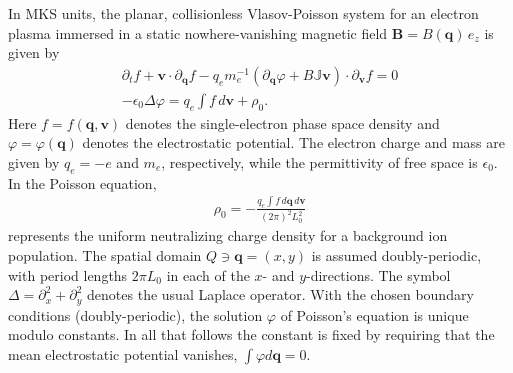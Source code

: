 \documentclass[%
 aip,
 amsmath,amssymb,
reprint, onecolumn %
]{revtex4-1}
\begin{document}
In MKS units, the planar, collisionless Vlasov-Poisson system for an electron plasma immersed in a static nowhere-vanishing magnetic field $\bm{B} = B(\bm{q})\,e_z$ is given by
\begin{gather*}
\partial_tf + \bm{v}\cdot\partial_{\bm{q}} f  -q_em_e^{-1}( \partial_{\bm{q}}\varphi + B\mathbb{J}\bm{v})\cdot\partial_{\bm{v}}f = 0\\
-\epsilon_0\Delta \varphi = q_e\int f\,d\bm{v} + \rho_0.
\end{gather*}
Here $f = f(\bm{q},\bm{v})$ denotes the single-electron phase space density and $\varphi = \varphi(\bm{q})$ denotes the electrostatic potential. The electron charge and mass are given by $q_e = -e$ and $m_e$, respectively, while the permittivity of free space is $\epsilon_0$. In the Poisson equation, 
\begin{align*}
\rho_0 = -\frac{q_e\int f\,d\bm{q}\,d\bm{v} }{(2\pi)^2L_0^2}
\end{align*}
represents the uniform neutralizing charge density for a background ion population. The spatial domain $Q\ni \bm{q} = (x,y)$ is assumed doubly-periodic, with period lengths $2\pi L_0$ in each of the $x$- and $y$-directions. The symbol $\Delta= \partial_x^2 + \partial_y^2$ denotes the usual Laplace operator. With the chosen boundary conditions (doubly-periodic), the solution $\varphi$ of Poisson's equation is unique modulo constants. In all that follows the constant is fixed by requiring that the mean electrostatic potential vanishes, $\int\varphi d\bm{q} = 0$.
\end{document}
